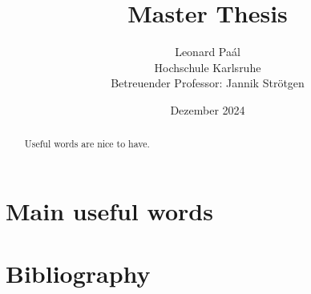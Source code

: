 \documentclass{article}
\title{Master Thesis}
\author{Leonard Paál\\Hochschule Karlsruhe\\Betreuender Professor: Jannik Strötgen}
\date{Dezember 2024}
\begin{document}
\maketitle
\begin{abstract}
\noindent Useful words are nice to have.
\end{abstract}

\clearpage
\tableofcontents
\clearpage

\section{Main useful words}
\section{Bibliography}


\end{document}
